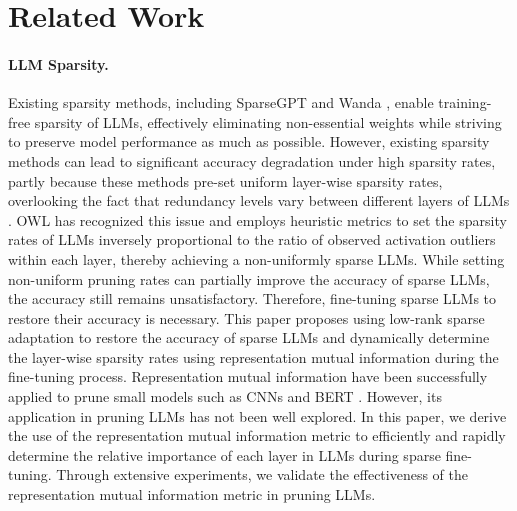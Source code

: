\section{Related Work}
\label{RelatedWork}
\paragraph{LLM Sparsity.} 
Existing sparsity methods, including SparseGPT \citep{frantar2023sparsegpt} and Wanda \citep{sun2023simple}, enable training-free sparsity of LLMs, effectively eliminating non-essential weights while striving to preserve model performance as much as possible. However, existing sparsity methods can lead to significant accuracy degradation under high sparsity rates, partly because these methods pre-set uniform layer-wise sparsity rates, overlooking the fact that redundancy levels vary between different layers of LLMs \citep{song2024sleb,men2024shortgpt,chen2024compressing}. OWL \citep{yin2023outlier} has recognized this issue and employs heuristic metrics to set the sparsity rates of LLMs inversely proportional to the ratio of observed activation outliers within each layer, thereby achieving a non-uniformly sparse LLMs. While setting non-uniform pruning rates can partially improve the accuracy of sparse LLMs, the accuracy still remains unsatisfactory. Therefore, fine-tuning sparse LLMs to restore their accuracy is necessary. This paper proposes using low-rank sparse adaptation to restore the accuracy of sparse LLMs and dynamically determine the layer-wise sparsity rates using representation mutual information during the fine-tuning process. Representation mutual information \citep{bachman2019learning, tschannen2019mutual} have been successfully applied to prune small models such as CNNs and BERT \citep{zheng2021information,fan2021layer, hu2024mpruner}. However, its application in pruning LLMs has not been well explored. In this paper, we derive the use of the representation mutual information metric to efficiently and rapidly determine the relative importance of each layer in LLMs during sparse fine-tuning. Through extensive experiments, we validate the effectiveness of the representation mutual information metric in pruning LLMs.


